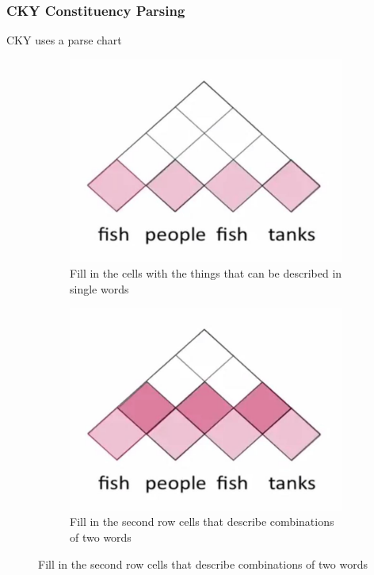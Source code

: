 \documentclass[11pt]{article}
\begin{document}
\subsubsection{CKY Constituency Parsing}
CKY uses a parse chart
\begin{figure}[H]
	\begin{subfigure}{0.45\linewidth}
		\centering
		\includegraphics[width=0.9\linewidth]{img/cky_constituency_parsing_graph01.png}
		\caption{Fill in the cells with the things that can be described in single words}
	\end{subfigure}
	\hspace{\fill}
	\begin{subfigure}{0.45\linewidth}
		\centering
		\includegraphics[width=0.9\linewidth]{img/cky_constituency_parsing_graph02.png}
		\caption{Fill in the second row cells that describe combinations of two words}
	\end{subfigure}

\end{figure}
\end{document}
